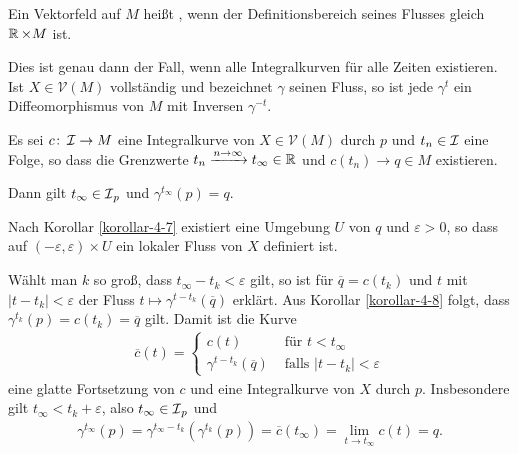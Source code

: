 \begin{Dfn}
  Ein Vektorfeld auf $M$ heißt , wenn der Definitionsbereich seines Flusses gleich $\operatorname{\mathbb{R}} \times M$ ist.
\end{Dfn}

\begin{bem}
  Dies ist genau dann der Fall, wenn alle Integralkurven für alle Zeiten existieren. Ist $X \in \mathcal V(M)$ vollständig und bezeichnet $\gamma$ seinen Fluss, so ist jede $\gamma^t$ ein Diffeomorphismus von $M$ mit Inversen $\gamma^{-t}$.
\end{bem}

\begin{Lemma}
  Es sei $c \colon \operatorname{\mathcal{I}} \to M$ eine Integralkurve von $X \in \mathcal V(M)$ durch $p$ und $t_n \in \operatorname{\mathcal{I}}$ eine Folge, so dass die Grenzwerte $t_n \xrightarrow{n\to\infty} t_{\infty} \in \operatorname{\mathbb{R}}$ und $c(t_n) \to q \in M$ existieren.
  
  Dann gilt $t_{\infty} \in \operatorname{\mathcal{I}}_{p}$ und $\gamma^{t_{\infty}}(p) = q$.
\end{Lemma}

\begin{bew}
  Nach Korollar \ref{korollar-4-7} existiert eine Umgebung $U$ von $q$ und $\varepsilon > 0$, so dass auf $(-\varepsilon,\varepsilon) \times U$ ein lokaler Fluss von $X$ definiert ist.
  
  Wählt man $k$ so groß, dass $t_{\infty} - t_k < \varepsilon$ gilt, so ist für $\overline q = c(t_k)$ und $t$ mit $|t-t_k| < \varepsilon$ der Fluss $t \mapsto \gamma^{t-t_k}(\overline q)$ erklärt. Aus Korollar \ref{korollar-4-8} folgt, dass $\gamma^{t_k}(p) = c(t_k) = \overline q$ gilt.
  Damit ist die Kurve
  \begin{align*}
    \overline c(t) =
    \begin{cases}
      c(t) & \text{ für } t < t_{\infty}\\
      \gamma^{t-t_k}(\overline q) & \text{ falls } |t-t_k| < \varepsilon
    \end{cases}
  \end{align*}
  eine glatte Fortsetzung von $c$ und eine Integralkurve von $X$ durch $p$.
  Insbesondere gilt $t_{\infty} < t_k + \varepsilon$, also $t_{\infty} \in \operatorname{\mathcal{I}}_p$ und
  \begin{align*}
    \gamma^{t_{\infty}}(p)= \gamma^{t_{\infty}-t_k}(\gamma^{t_k}(p)) = \overline c(t_{\infty}) = \lim_{t\to t_{\infty}}c(t) = q.
  \end{align*}
\end{bew}

